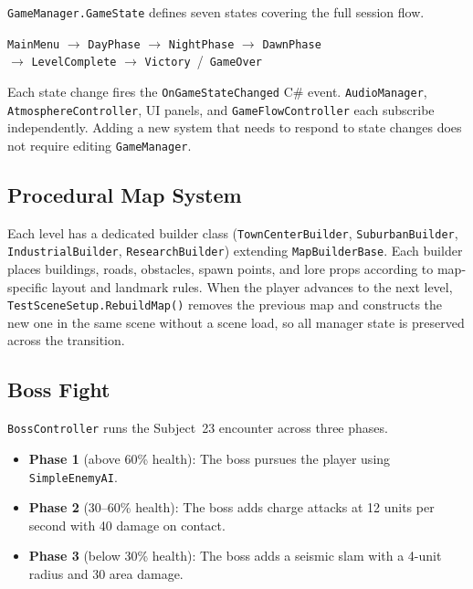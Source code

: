 \documentclass[11pt,a4paper]{article}
\begin{document}
\texttt{GameManager.GameState} defines seven states covering the full session flow.

\begin{center}
\small
\texttt{MainMenu} $\to$ \texttt{DayPhase} $\to$ \texttt{NightPhase} $\to$ \texttt{DawnPhase} \\[2pt]
$\to$ \texttt{LevelComplete} $\to$ \texttt{Victory} \,/\, \texttt{GameOver}
\end{center}

Each state change fires the \texttt{OnGameStateChanged} C\# event. \texttt{AudioManager}, \texttt{AtmosphereController}, UI panels, and \texttt{GameFlowController} each subscribe independently. Adding a new system that needs to respond to state changes does not require editing \texttt{GameManager}.

\subsection{Procedural Map System}

Each level has a dedicated builder class (\texttt{TownCenterBuilder}, \texttt{SuburbanBuilder}, \texttt{IndustrialBuilder}, \texttt{ResearchBuilder}) extending \texttt{MapBuilderBase}. Each builder places buildings, roads, obstacles, spawn points, and lore props according to map-specific layout and landmark rules. When the player advances to the next level, \texttt{TestSceneSetup.RebuildMap()} removes the previous map and constructs the new one in the same scene without a scene load, so all manager state is preserved across the transition.

\subsection{Boss Fight}
\label{sec:boss}

\texttt{BossController} runs the Subject~23 encounter across three phases.

\begin{itemize}[noitemsep]
  \item \textbf{Phase 1} (above 60\% health): The boss pursues the player using \texttt{SimpleEnemyAI}.
  \item \textbf{Phase 2} (30--60\% health): The boss adds charge attacks at 12 units per second with 40 damage on contact.
  \item \textbf{Phase 3} (below 30\% health): The boss adds a seismic slam with a 4-unit radius and 30 area damage.
\end{itemize}
\end{document}
